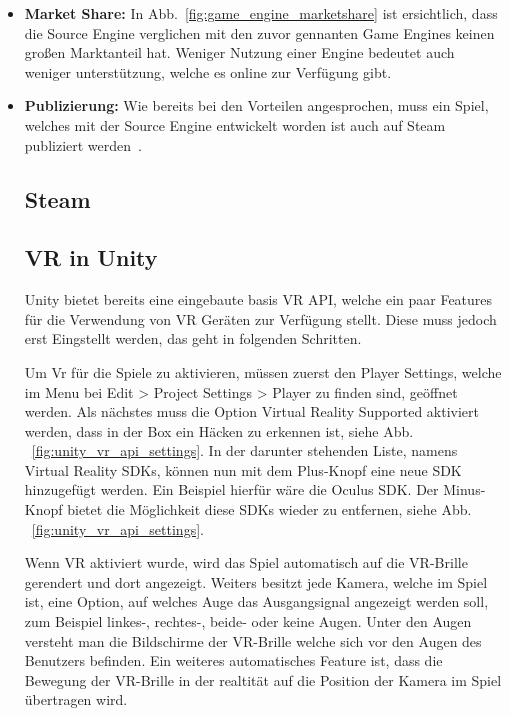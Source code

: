\begin{itemize}
    \item \textbf{Market Share:} In Abb.~\ref{fig:game_engine_marketshare} ist ersichtlich, dass die Source Engine verglichen mit den zuvor gennanten Game Engines keinen großen Marktanteil hat.
    Weniger Nutzung einer Engine bedeutet auch weniger unterstützung, welche es online zur Verfügung gibt.
    \item \textbf{Publizierung:} Wie bereits bei den Vorteilen angesprochen, muss ein Spiel, welches mit der Source Engine entwickelt worden ist auch auf Steam publiziert werden~\cite{Brenna_Hillier_2015}.

\subsection{Steam}\label{subsec:steam}

\subsection{VR in Unity}
Unity bietet bereits eine eingebaute basis VR API, welche ein paar Features für die Verwendung von VR Geräten zur Verfügung stellt.
Diese muss jedoch erst Eingstellt werden, das geht in folgenden Schritten.

Um Vr für die Spiele zu aktivieren, müssen zuerst den Player Settings, welche im Menu bei Edit > Project Settings > Player zu finden sind, geöffnet werden.
Als nächstes muss die Option Virtual Reality Supported aktiviert werden, dass in der Box ein Häcken zu erkennen ist, siehe Abb. ~\ref{fig:unity_vr_api_settings}.
In der darunter stehenden Liste, namens Virtual Reality SDKs, können nun mit dem Plus-Knopf eine neue SDK hinzugefügt werden.
Ein Beispiel hierfür wäre die Oculus SDK.
Der Minus-Knopf bietet die Möglichkeit diese SDKs wieder zu entfernen, siehe Abb. ~\ref{fig:unity_vr_api_settings}.
~\cite{Unity_VR_Overview_2022}

Wenn VR aktiviert wurde, wird das Spiel automatisch auf die VR-Brille gerendert und dort angezeigt.
Weiters besitzt jede Kamera, welche im Spiel ist, eine Option, auf welches Auge das Ausgangsignal angezeigt werden soll, zum Beispiel linkes-, rechtes-, beide- oder keine Augen.
Unter den Augen versteht man die Bildschirme der VR-Brille welche sich vor den Augen des Benutzers befinden.
Ein weiteres automatisches Feature ist, dass die Bewegung der VR-Brille in der realtität auf die Position der Kamera im Spiel übertragen wird.


\end{itemize}
